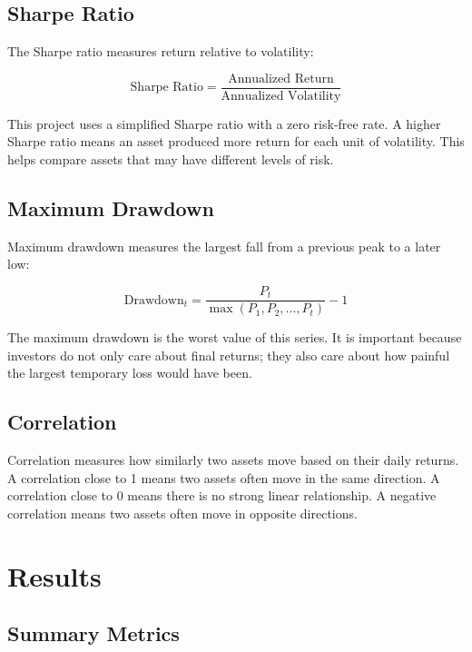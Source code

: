 \documentclass[12pt,a4paper]{article}
\begin{document}
\subsection{Sharpe Ratio}

The Sharpe ratio measures return relative to volatility:

\begin{equation}
    \text{Sharpe Ratio} = \frac{\text{Annualized Return}}{\text{Annualized Volatility}}
\end{equation}

This project uses a simplified Sharpe ratio with a zero risk-free rate. A higher Sharpe ratio means an asset produced more return for each unit of volatility. This helps compare assets that may have different levels of risk.

\subsection{Maximum Drawdown}

Maximum drawdown measures the largest fall from a previous peak to a later low:

\begin{equation}
    \text{Drawdown}_t = \frac{P_t}{\max(P_1, P_2, ..., P_t)} - 1
\end{equation}

The maximum drawdown is the worst value of this series. It is important because investors do not only care about final returns; they also care about how painful the largest temporary loss would have been.

\subsection{Correlation}

Correlation measures how similarly two assets move based on their daily returns. A correlation close to 1 means two assets often move in the same direction. A correlation close to 0 means there is no strong linear relationship. A negative correlation means two assets often move in opposite directions.

\section{Results}

\subsection{Summary Metrics}
\end{document}

